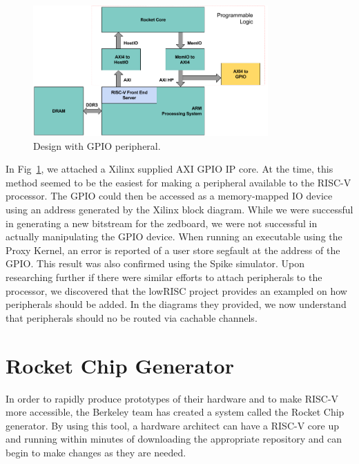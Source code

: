 \documentclass[journal]{IEEEtran}
\begin{document}
\begin{figure} %
\centering
\includegraphics[width=9cm ]{./graphics/zynq_w_gpio.png}
\centering
\caption{Design with GPIO peripheral.}
\label{fig:gpio}
\end{figure}
In Fig~\ref{fig:gpio}, we attached a Xilinx supplied AXI GPIO IP core. At the time, this method seemed to be the easiest for making a peripheral available to the RISC-V processor. The GPIO could then be accessed as a memory-mapped IO device using an address generated by the Xilinx block diagram. While we were successful in generating a new bitstream for the zedboard, we were not successful in actually manipulating the GPIO device. When running an executable using the Proxy Kernel\cite{pk}, an error is reported of a user store segfault at the address of the GPIO. This result was also confirmed using the Spike simulator. Upon researching further if there were similar efforts to attach peripherals to the processor, we discovered that the lowRISC project provides an exampled on how peripherals should be added\cite{lowrisc}. In the diagrams they provided, we now understand that peripherals should no be routed via cachable channels.

\section{Rocket Chip Generator}
In order to rapidly produce prototypes of their hardware and to make RISC-V more accessible, the Berkeley team has created a system called the Rocket Chip generator. By using this tool, a hardware architect can have a RISC-V core up and running within minutes of downloading the appropriate repository and can begin to make changes as they are needed.
\end{document}
